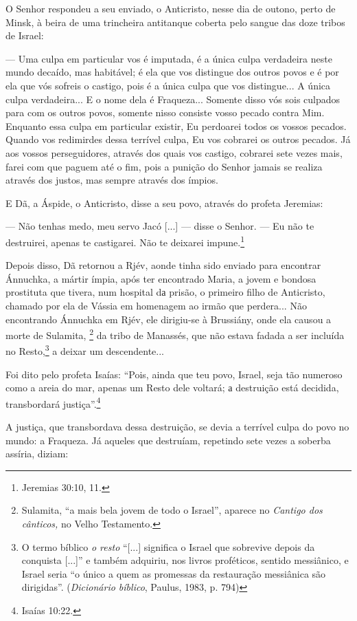 O Senhor respondeu a seu enviado, o Anticristo, nesse dia de outono,
perto de Minsk, à beira de uma trincheira antitanque coberta pelo sangue
das doze tribos de Israel:

--- Uma culpa em particular vos é imputada, é a única culpa verdadeira
neste mundo decaído, mas habitável; é ela que vos distingue dos outros
povos e é por ela que vós sofreis o castigo, pois é a única culpa que
vos distingue... A única culpa verdadeira... E o nome dela é Fraqueza...
Somente disso vós sois culpados para com os outros povos, somente nisso
consiste vosso pecado contra Mim. Enquanto essa culpa em particular
existir, Eu perdoarei todos os vossos pecados. Quando vos redimirdes
dessa terrível culpa, Eu vos cobrarei os outros pecados. Já aos vossos
perseguidores, através dos quais vos castigo, cobrarei sete vezes mais,
farei com que paguem até o fim, pois a punição do Senhor jamais se
realiza através dos justos, mas sempre através dos ímpios.

E Dã, a Áspide, o Anticristo, disse a seu povo, através do profeta
Jeremias:

--- Não tenhas medo, meu servo Jacó {[}...{]} --- disse o Senhor. --- Eu
não te destruirei, apenas te castigarei. Não te deixarei
impune.\footnote{Jeremias 30:10, 11.}

Depois disso, Dã retornou a Rjév, aonde tinha sido enviado para
encontrar Ánnuchka, a mártir ímpia, após ter encontrado Maria, a jovem e
bondosa prostituta que tivera, num hospital dа prisão, o primeiro filho
de Anticristo, chamado por ela de Vássia em homenagem ao irmão que
perdera... Não encontrando Ánnuchka em Rjév, ele dirigiu-se à Brussiány,
onde ela causou a morte de Sulamita, \footnote{Sulamita, ``a mais bela
  jovem de todo o Israel'', aparece no \emph{Cantigo dos cânticos,} no
  Velho Testamento.} da tribo de Manassés, que não estava fadada a ser
incluída no Resto,\footnote{O termo bíblico \emph{o resto} ``{[}...{]}
  significa o Israel que sobrevive depois da conquista {[}...{]}'' e
  também adquiriu, nos livros proféticos, sentido messiânico, e Israel
  seria ``o único a quem as promessas da restauração messiânica são
  dirigidas''. (\emph{Dicionário bíblico}, Paulus, 1983, p. 794)} a
deixar um descendente...

Foi dito pelo profeta Isaías: ``Pois, ainda que teu povo, Israel, seja
tão numeroso como a areia do mar, apenas um Resto dele voltará; а
destruição está decidida, transbordará justiça''.\footnote{Isaías 10:22.}

A justiça, que transbordava dessa destruição, se devia a terrível culpa
do povo no mundo: a Fraqueza. Já aqueles que destruíam, repetindo sete
vezes a soberba assíria, diziam:


